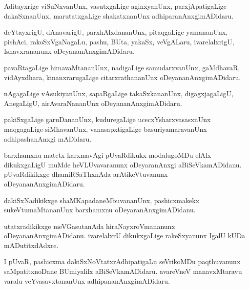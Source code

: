 \documentclass{article}
\begin{document}
\begin{mn}
Aditayxrige viSuNxvanUnx, vasutxgaLige aginxyanUnx, parxjApatigaLige
dakaSxnanUnx, marutatxgaLige shakatxnanUnx adhiparanAnxgimADidaru.
\end{mn}

\begin{mn}
deYtayxrigU, dAnavarigU, parxhAlxdananUnx, pitaqgaLige yamananUnx,
pishAci, rakoSxVgaNagaLu, pashu, BUta, yakaSx, veVgALaru,
ivarelalxrigU, Ishavxrananunx oDeyananAnxgimADidaru.
\end{mn}

\begin{mn}
pavaRtagaLige himavaMtananUnx, nadigaLige samudarxvanUnx, gaMdhavaR,
vidAyxdhara, kinanxrarugaLige citarxrathananUnx oDeyananAnxgimADidaru.
\end{mn}

\begin{mn}
nAgagaLige vAsukiyanUnx, sapaRgaLige takaSxkananUnx, digagxjagaLigU,
AnegaLigU, airAvaraNananUnx oDeyananAnxgimADidaru.
\end{mn}

\begin{mn}
pakiSxgaLige garuDananUnx, kuduregaLige ucecxYsharxvasasxnUnx
maqgagaLige siMhavanUnx, vanasapxtigaLige basuriyamaravanUnx
adhipashanAnxgi mADidaru.
\end{mn}

\begin{mn}
barxhamxnu matetx karxmavAgi pUvaRdikukx modalugoMDu elAlx
dikukxgaLigU muMde heVLUvavaranunx oDeyaranAnxgi
aBiSeVkamADidanu. pUvaRdikikxge dhamiRSaThxnAda arAtikeVtuvanunx oDeyananAnxgimADidaru.
\end{mn}

\begin{mn}%
dakiSxNadikikxge shaMKapadaneMbuvananUnx, pashicxmakekx
sukeVtumaMtananUnx barxhamxnu oDeyaranAnxgimADidanu.
\end{mn}

\begin{mn}
utatxradikikxge meVGasutanAda hiraNayxroVmananunx
oDeyananAnxgimADidanu. ivarelalxrU dikukxgaLige rakeSxyanunx IgalU
kUDa mADutitxdAdxre.
\end{mn}

\begin{mn}
I pUvaR, pashicxma dakiSxNoVtatxrAdhipatigaLu seVrikoMDu paqthuvanunx
saMpatitxnoDane BUmiyalilx aBiSeVkamADidaru. avareVneV manavxMtaravu
varalu veYvasavxtananUnx adhipananAnxgimADidaru.
\end{mn}
\end{document}
